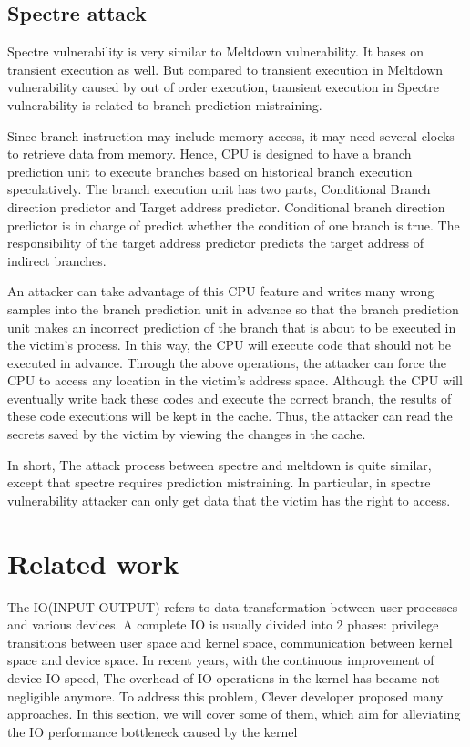 \subsection{Spectre attack}

Spectre vulnerability is very similar to 
Meltdown vulnerability. It bases on transient 
execution as well. But compared to transient 
execution in Meltdown vulnerability caused by 
out of order execution,  transient execution 
in Spectre vulnerability is related to branch 
prediction mistraining. 

Since branch instruction may include memory access, 
it may need several clocks to retrieve data from memory.
Hence, CPU is designed to have a branch prediction unit 
to execute branches based on historical branch execution 
speculatively. The branch execution unit has two parts,
Conditional Branch direction predictor and Target address 
predictor. Conditional branch direction predictor is 
in charge of predict whether the condition of one branch is true.
The responsibility of the target address predictor predicts the 
target address of indirect branches.

An attacker can take advantage of this CPU feature and writes many wrong samples into the branch prediction unit in advance so that the branch prediction unit makes an incorrect prediction of the branch that is about to be executed in the victim's process. In this way, the CPU will execute code that should not be executed in advance. Through the above operations, the attacker can force the CPU to access any location in the victim's address space. Although the CPU will eventually write back these codes and execute the correct branch, the results of these code executions will be kept in the cache. Thus, the attacker can read the secrets saved by the victim by viewing the changes in the cache.

In short, The attack process between spectre and meltdown 
is quite similar, except that spectre requires prediction 
mistraining. In particular, in spectre vulnerability attacker
 can only get data that the victim has the right to access.





\section{Related work}
The IO(INPUT-OUTPUT) refers to data transformation
between user processes and various devices.
A complete IO is usually divided into 2 phases: 
privilege transitions between user space and kernel 
space, communication between kernel space and device 
space. In recent years, with the continuous improvement 
of device IO speed, The overhead of IO operations 
in the kernel has became not negligible anymore. 
To address this problem, Clever developer proposed many 
approaches. In this section, we will cover some of them,
which aim for alleviating the IO performance 
bottleneck caused by the kernel


